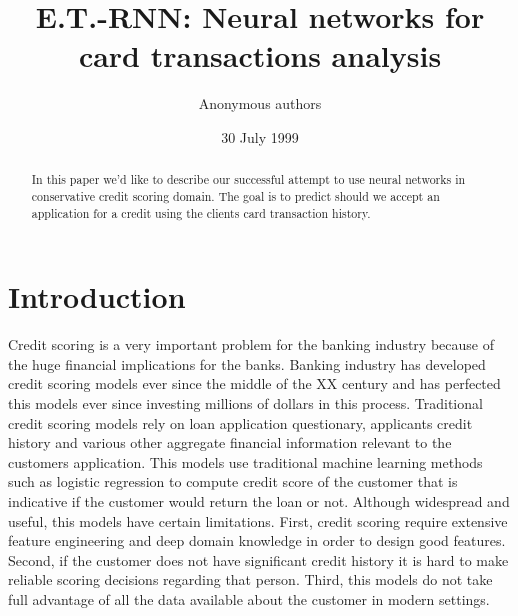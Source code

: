 \documentclass[sigconf]{acmart}
\begin{document}
\title{E.T.-RNN: Neural networks for card transactions analysis}

\author{Anonymous authors}

\date{30 July 1999}

\begin{abstract}
In this paper we'd like to describe our successful attempt to use neural networks in conservative credit scoring domain.
The goal is to predict should we accept an application for a credit using the clients card transaction history.
\end{abstract}

\maketitle

\section{Introduction}

Credit scoring is a very important problem for the banking industry because of the huge financial implications for the banks. Banking industry has developed credit scoring models ever since the middle of the XX century  and has perfected this models ever since investing millions of dollars in this process. Traditional credit scoring models rely on loan application questionary, applicants credit history and various other aggregate financial information relevant to the customers application. This models use traditional machine learning methods such as logistic regression to compute credit score of the customer that is indicative if the customer would return the loan or not. Although widespread and useful, this models have certain limitations. First, credit scoring require extensive feature engineering and deep domain knowledge in order to design good features.
Second, if the customer does not have significant credit history it is hard to make reliable scoring decisions regarding that person. Third, this models do not take full advantage of all the data available about the customer in modern settings.
\end{document}
